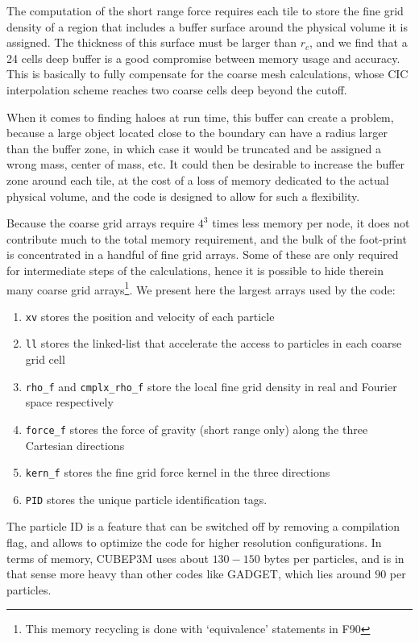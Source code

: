 The computation of the short range force requires each tile to store the fine grid density of a region that includes a buffer surface around the physical volume it is assigned. The thickness of this surface must be larger than $r_{c}$, and we find that a 24 cells deep buffer
is a good compromise between memory usage and accuracy.
This is basically to fully compensate for the coarse mesh calculations, whose CIC interpolation scheme 
reaches two coarse cells deep beyond the cutoff.   

When it comes to finding haloes at run time, this buffer can create a problem, because a large object located close to the boundary can have a radius larger than the buffer zone, in which case it would be truncated and be assigned a wrong mass, center of mass, etc. 
It could then be desirable to increase the buffer zone around each tile, at the cost of a loss of memory dedicated to the actual physical volume, and the code is designed to allow for such a flexibility.



Because the coarse grid arrays require $4^3$ times less memory per node, 
it does not contribute much to the total memory requirement, and the bulk of the foot-print is 
concentrated in a handful of fine grid arrays.
Some of these are only required for intermediate steps of the calculations, 
hence it is possible to hide therein many coarse grid arrays\footnote{ This memory recycling is done with `equivalence' statements in {\small F90}}.   
We present here the largest arrays used by the code:
\begin{enumerate}
\item{{\tt xv} stores the position and velocity of each particle} 
\item{{\tt ll} stores the linked-list that accelerate the access to particles in each coarse grid cell}
\item{{\tt rho\_f} and {\tt cmplx\_rho\_f} store 
the local fine grid density  in real and Fourier space respectively}
\item{{\tt force\_f} stores the force of gravity (short range only) along the three Cartesian directions}
\item{{\tt kern\_f} stores the fine grid force kernel in the three directions}
\item{{\tt PID} stores the unique particle identification tags.}
\end{enumerate}
The particle ID is a feature that can be switched off by removing a compilation flag, 
and allows to optimize the code for higher resolution configurations.
In terms of memory, {\small CUBEP3M} uses about $130 - 150$ bytes per particles, and is in that sense more heavy than other codes like {\small GADGET}, which 
lies around $90$ per particles.

